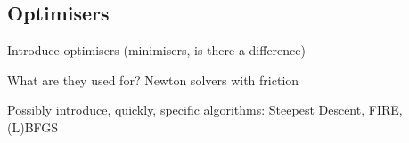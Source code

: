 \subsection{Optimisers}
\label{sec:optimisers}

\bit
\item Introduce optimisers (minimisers, is there a difference)
\item What are they used for? Newton solvers with friction
\item Possibly introduce, quickly, specific algorithms: Steepest Descent, FIRE, (L)BFGS
\eit

\placeholder
